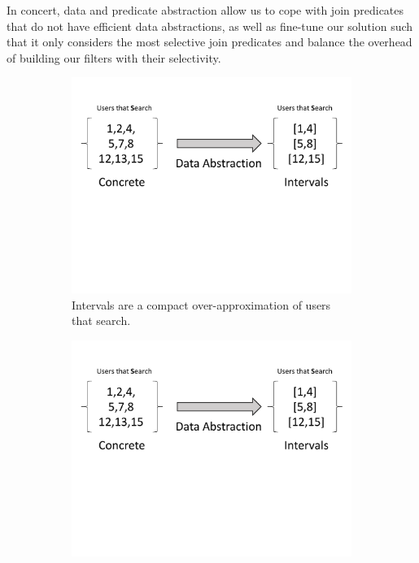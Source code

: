 In concert, data and predicate abstraction allow us to cope with join predicates
that do not have efficient data abstractions, as well as fine-tune our solution
such that it only considers the most selective join predicates and balance the
overhead of building our filters with their selectivity.
\begin{figure}[t]
  \centering
  \begin{subfigure}{\columnwidth}
    \centering    
    \vspace{-0.5cm}
    \includegraphics[clip, page=1,width=\columnwidth]{graphs/motivation.pdf}
    \vspace{-3.5cm}
    \caption{Intervals are a compact over-approximation of users that search.}
    \label{fig:dabstraction}
  \end{subfigure}
  \begin{subfigure}{\columnwidth}
    \vspace{-0.5cm}
    \includegraphics[clip, page=2,width=\columnwidth]{graphs/motivation.pdf}

\end{subfigure}
\end{figure}
